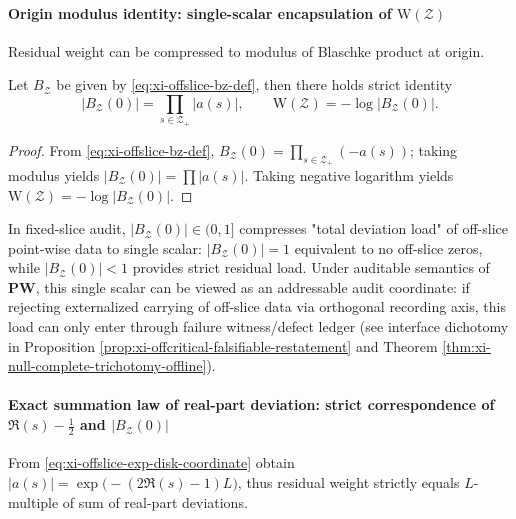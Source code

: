 \paragraph{Origin modulus identity: single-scalar encapsulation of \texorpdfstring{$\mathrm{W}(\mathcal Z)$}{W(Z)}}
Residual weight can be compressed to modulus of Blaschke product at origin.

\begin{theorem}\label{thm:xi-offslice-blaschke-origin-modulus}
Let \(B_{\mathcal Z}\) be given by \eqref{eq:xi-offslice-bz-def}, then there holds strict identity
\[
|B_{\mathcal Z}(0)|=\prod_{s\in\mathcal Z_{+}}|a(s)|,
\qquad
\mathrm{W}(\mathcal Z)=-\log|B_{\mathcal Z}(0)|.
\]
\end{theorem}

\begin{proof}
From \eqref{eq:xi-offslice-bz-def},
\(
B_{\mathcal Z}(0)=\prod_{s\in\mathcal Z_{+}}(-a(s))
\);
taking modulus yields \(|B_{\mathcal Z}(0)|=\prod|a(s)|\).
Taking negative logarithm yields \(\mathrm{W}(\mathcal Z)=-\log|B_{\mathcal Z}(0)|\).
\end{proof}

\begin{remark}\label{rem:xi-offslice-origin-modulus-contract-loss}
In fixed-slice audit, \(|B_{\mathcal Z}(0)|\in(0,1]\) compresses "total deviation load" of off-slice point-wise data to single scalar: \(|B_{\mathcal Z}(0)|=1\) equivalent to no off-slice zeros, while \(|B_{\mathcal Z}(0)|<1\) provides strict residual load.
Under auditable semantics of \(\mathbf{PW}\), this single scalar can be viewed as an addressable audit coordinate: if rejecting externalized carrying of off-slice data via orthogonal recording axis, this load can only enter through failure witness/defect ledger (see interface dichotomy in Proposition \ref{prop:xi-offcritical-falsifiable-restatement} and Theorem \ref{thm:xi-null-complete-trichotomy-offline}).
\end{remark}

\paragraph{Exact summation law of real-part deviation: strict correspondence of \texorpdfstring{$\Re(s)-\tfrac12$}{Re(s)-1/2} and \texorpdfstring{$|B_{\mathcal Z}(0)|$}{|B(0)|}}
From \eqref{eq:xi-offslice-exp-disk-coordinate} obtain
\(
|a(s)|=\exp\!\bigl(-(2\Re(s)-1)L\bigr)
\), thus residual weight strictly equals \(L\)-multiple of sum of real-part deviations.

